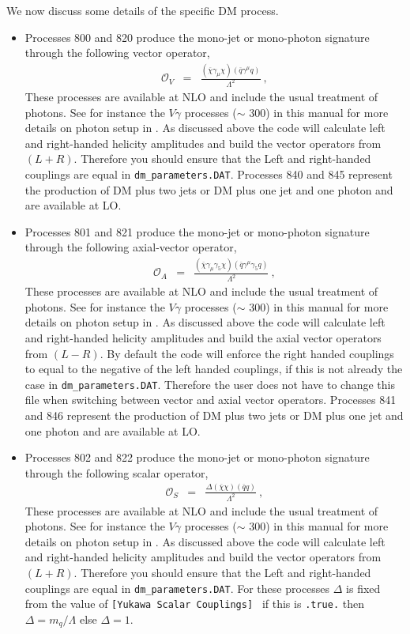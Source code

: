 \documentclass{article}
\begin{document}
{{{{{{We now discuss some details of the specific DM process.

\begin{itemize}
\item 
Processes 800 and 820 produce the 
mono-jet or mono-photon signature through the following vector operator, 
\begin{eqnarray}
\mathcal{O}_V&=&\frac{(\overline{\chi}\gamma_{\mu}\chi)(\overline{q}\gamma^{\mu}q)}{\Lambda^2}~,\label{eq:OV}  
\end{eqnarray}
These processes are available at NLO and include the usual treatment of photons. See for instance the $V\gamma$ processes ($\sim$ 300) in this 
manual for more details on photon setup in \MCFM. As discussed above the code will calculate left and right-handed helicity amplitudes and build the 
vector operators from $(L+R)$. Therefore you should ensure that the Left and right-handed couplings are equal in  {\tt dm\_parameters.DAT}. 
Processes 840 and 845 represent the production of DM plus two jets or DM plus one jet and one photon and are available at LO. 
\item 
Processes 801 and 821 produce the 
mono-jet or mono-photon signature through the following axial-vector operator, 
\begin{eqnarray}
\mathcal{O}_A&=&\frac{(\overline{\chi}\gamma_{\mu}\gamma_5\chi)(\overline{q}\gamma^{\mu}\gamma_5q)}{\Lambda^2}~,\label{eq:OA}
\end{eqnarray}
These processes are available at NLO and include the usual treatment
of photons. See for instance the $V\gamma$ processes ($\sim$ 300) in
this manual for more details on photon setup in \MCFM. As discussed
above the code will calculate left and right-handed helicity
amplitudes and build the axial vector operators from $(L-R)$. By
default the code will enforce the right handed couplings to equal to
the negative of the left handed couplings, if this is not
already the case in {\tt dm\_parameters.DAT}. Therefore the user does
not have to change this file when switching between vector and axial
vector operators.  Processes 841 and 846 represent the production of
DM plus two jets or DM plus one jet and one photon and are available
at LO.
\item 
Processes 802 and 822 produce the 
mono-jet or mono-photon signature through the following scalar operator, 
\begin{eqnarray}
\mathcal{O}_S&=&\frac{\Delta(\overline{\chi}\chi)(\overline{q}q)}{\Lambda^2}~,
\end{eqnarray}
These processes are available at NLO and include the usual treatment
of photons. See for instance the $V\gamma$ processes ($\sim$ 300) in
this manual for more details on photon setup in \MCFM. As discussed
above the code will calculate left and right-handed helicity
amplitudes and build the vector operators from $(L+R)$. Therefore you
should ensure that the Left and right-handed couplings are equal in
{\tt dm\_parameters.DAT}. For these processes $\Delta$ is fixed from
the value of {\tt [Yukawa Scalar Couplings] } if this is {\tt .true.}
then $\Delta=m_q/\Lambda$ else $\Delta=1$.


\end{itemize}}}}}}}
\end{document}

